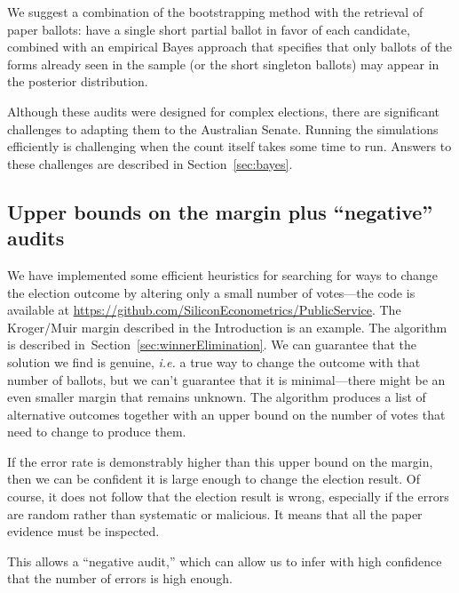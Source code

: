\documentclass[10pt,a4paper]{article}
\newcommand{\shortVersion}[1]{}
\newcommand{\longVersion}[1]{#1}
\newcommand{\shortVersion}[1]{#1}
\newcommand{\longVersion}[1]{}
\begin{document}
We suggest a combination of the bootstrapping method with the retrieval of
paper ballots: have a single short partial ballot in
favor of each candidate, combined with an empirical Bayes approach that
specifies that only ballots of the forms already seen in the sample
(or the short singleton ballots) may appear in the posterior distribution.

Although these audits were designed for complex elections, there are
significant challenges to adapting them to the Australian Senate.  
Running the simulations efficiently is challenging when the count itself takes
some time to run.  Answers to these challenges are described in
\shortVersion{the full version of the paper.}\longVersion{Section~\ref{sec:bayes}.}

\subsection{Upper bounds on the margin plus ``negative'' audits}  \label{subsec:upperBounds}
We have implemented some efficient heuristics for searching for ways to change the election outcome by altering only a small number of votes---the code is available at \url{https://github.com/SiliconEconometrics/PublicService}.  The Kroger/Muir margin described in the Introduction is an example.   \longVersion{The algorithm is described in~Section~\ref{sec:winnerElimination}.} 
We can guarantee that the solution we find is genuine, {\it i.e.} a true way to change the outcome with that number of ballots, but we can't guarantee that it is minimal---there might be an even smaller margin that remains unknown.  The algorithm produces a list of alternative outcomes together with an upper bound on the number of votes that need to change to produce them.

If the error rate is demonstrably higher than this upper bound on the margin, then we can be confident it is large enough to change the election result. Of course, it does not follow that the election result is wrong, especially if the errors are random rather than systematic or malicious.  It means that all the paper evidence must be inspected.  

This allows a ``negative audit,'' which can allow us to infer with high confidence that the number of errors is high enough.   
\end{document}
